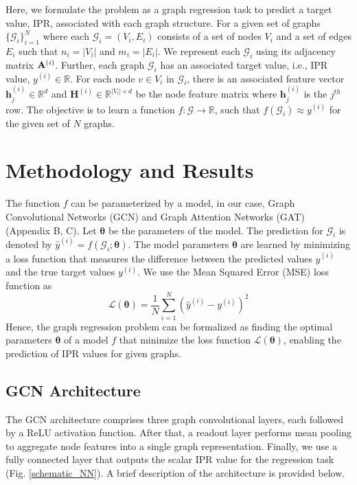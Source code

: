\documentclass[aps, prd, showpacs, floatfix, superscriptaddress, twocolumn, nofootinbib, preprintnumbers, longbibliography]{revtex4-2}
\begin{document}
%
Here, we formulate the problem as a graph regression task to predict a target value, IPR, associated with each graph structure. For a given set of graphs $\{\mathcal{G}_i\}_{i=1}^N$ where each  $\mathcal{G}_i = (V_{i}, E_{i})$ consists of a set of nodes $V_i$ and a set of edges $E_{i}$ such that $n_i=|V_i|$ and $m_i=|E_i|$. We represent each $\mathcal{G}_i$ using its adjacency matrix ${\bf A}^{(i)}$. Further, each graph $\mathcal{G}_i$ has an associated target value, i.e., IPR value, $y^{(i)} \in \mathbb{R}$. For each node $v \in V_{i}$ in $ \mathcal{G}_i$, there is an associated feature vector $\bm{h}_j^{(i)} \in \mathbb{R}^d$ and $\mathbf{H}^{(i)} \in \mathbb{R}^{|V_i| \times d}$ be the node feature matrix where $\bm{h}_j^{(i)}$ is the $j^{th}$ row. The objective is to learn a function $f: \mathcal{G} \to \mathbb{R}$, such that $f(\mathcal{G}_i) \approx y^{(i)}$ for the given set of $N$ graphs.


\section{Methodology and Results}
The function $f$ can be parameterized by a model, in our case, Graph Convolutional Networks (GCN) and Graph Attention Networks (GAT) (Appendix B, C). Let $\bm{\theta}$ be the parameters of the model. The prediction for $\mathcal{G}_i$ is denoted by $ \hat{y}^{(i)} = f(\mathcal{G}_i; \bm{\theta})$. The model parameters $\bm{\theta}$ are learned by minimizing a loss function that measures the difference between the predicted values $\hat{y}^{(i)}$ and the true target values $y^{(i)}$. We use the Mean Squared Error (MSE) loss function as
\begin{equation}
\mathcal{L}(\bm{\theta}) = \frac{1}{N} \sum_{i=1}^N (\hat{y}^{(i)} - y^{(i)})^2 
\end{equation}
Hence, the graph regression problem can be formalized as finding the optimal parameters $\bm{\theta}$ of a model $f$ that minimize the loss function $\mathcal{L}(\bm{\theta})$, enabling the prediction of IPR values for given graphs. 
\subsection{GCN Architecture}
The GCN architecture comprises three graph convolutional layers, each followed by a ReLU activation function. After that, a readout layer performs mean pooling to aggregate node features into a single graph representation. Finally, we use a fully connected layer that outputs the scalar IPR value for the regression task (Fig. \ref{schematic_NN}). A brief description of the architecture is provided below.
\end{document}
